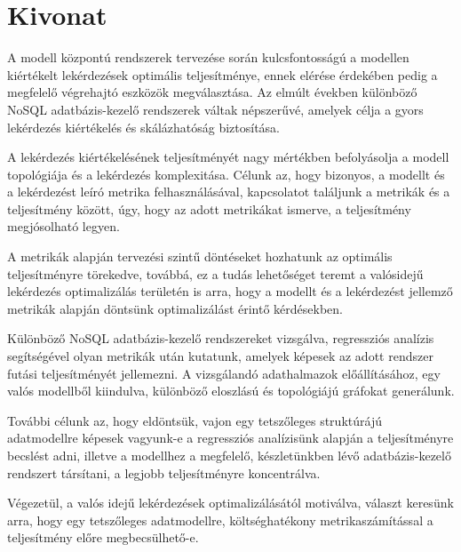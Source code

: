 \setcounter{page}{1}


\englishParagraph
\chapter*{Kivonat}
A modell központú rendszerek tervezése során kulcsfontosságú a modellen kiértékelt lekérdezések optimális teljesítménye, ennek elérése érdekében pedig a megfelelő végrehajtó eszközök megválasztása. Az elmúlt években különböző NoSQL adatbázis-kezelő rendszerek váltak népszerűvé, amelyek célja a gyors lekérdezés kiértékelés és skálázhatóság biztosítása.

A lekérdezés kiértékelésének teljesítményét nagy mértékben befolyásolja a modell topológiája és a lekérdezés komplexitása. Célunk az, hogy bizonyos, a modellt és a lekérdezést leíró metrika felhasználásával, kapcsolatot találjunk a metrikák és a teljesítmény között, úgy, hogy az adott metrikákat ismerve, a teljesítmény megjósolható legyen.

A metrikák alapján tervezési szintű döntéseket hozhatunk az optimális teljesítményre törekedve, továbbá, ez a tudás lehetőséget teremt a valósidejű lekérdezés optimalizálás területén is arra, hogy a modellt és a lekérdezést jellemző metrikák alapján döntsünk optimalizálást érintő kérdésekben.

Különböző NoSQL adatbázis-kezelő rendszereket vizsgálva, regressziós analízis segítségével olyan metrikák után kutatunk, amelyek képesek az adott rendszer futási teljesítményét jellemezni. A vizsgálandó adathalmazok előállításához, egy valós modellből kiindulva, különböző eloszlású és topológiájú gráfokat generálunk.

További célunk az, hogy eldöntsük, vajon egy tetszőleges struktúrájú adatmodellre képesek vagyunk-e a regressziós analízisünk alapján a teljesítményre becslést adni, illetve a modellhez a megfelelő, készletünkben lévő adatbázis-kezelő rendszert társítani, a legjobb teljesítményre koncentrálva. 

Végezetül, a valós idejű lekérdezések optimalizálásától motiválva, választ keresünk arra, hogy egy tetszőleges adatmodellre, költséghatékony  metrikaszámítással a teljesítmény előre megbecsülhető-e.



